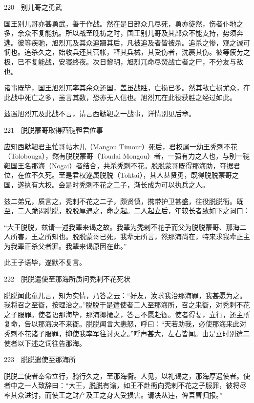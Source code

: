 \documentclass[12pt,UTF8]{ctexbook}
\begin{document}
220　别儿哥之勇武

国王别儿哥亦甚勇武，善于作战。然在是日部众几尽死，勇亦徒然，伤者仆地之多，余众不复能抗。所以战至晚祷之时，国王别儿哥及其部众不能支持，势须奔逃。彼等疾驰，旭烈兀及其众追蹑其后，凡被追及者皆被杀。追杀之惨，观之诚可悯也。追杀久之，始收兵还其营帐，释其兵械，其受伤者，洗裹其伤。彼等疲劳之极，已不复能战，安寝终夜。次日黎明，旭烈兀命尽焚战亡者之尸，不分友与敌也。

诸事既毕，国王旭烈兀率其余众还国，盖虽战胜，亡损已多。然其敌亡损尤众，在此战中死亡之多，虽言其数，恐亦无人信也。旭烈兀在此役获胜之经过如此。

兹置旭烈兀及此战不言，请言西鞑靼之一战事，详情别见后章。





221　脱脱蒙哥取得西鞑靼君位事

应知西鞑靼君主忙哥帖木儿（Mangou Timour）死后，君权属一幼王秃剌不花（Tolobouga），然有脱脱蒙哥（Toudai Mongou）者，一强有力之人也，与别一鞑靼国王名那海（Nogai）者结合，共杀秃剌不花。脱脱蒙哥既得那海助，夺据君位，在位不久死。至是君权遂属脱脱（Toktai），其人甚贤勇，既得脱脱蒙哥之国，遂执有大权。会是时秃剌不花之二子，渐长成为可以执兵之人。

兹二弟兄，质言之，秃剌不花之二子，颇贤慎，携带护卫甚盛，往役脱脱衙。既至，二人跪谒脱脱，脱脱厚遇之，命之起。二人起立后，年较长者致如下之词曰：

“大王脱脱，兹请一述我辈来谒之故。我辈为秃剌不花子而父为脱脱蒙哥、那海二人所害，王之所知也。脱脱蒙哥已死，我辈无所言，然那海尚在，特来求我辈正主为我辈正杀父者罪。我辈来谒原因在此。”

此王子语毕，遂默不复言。





222　脱脱遣使至那海所质问秃剌不花死状

脱脱闻此童儿言，知为实情，乃答之云：“好友，汝求我治那海罪，我甚愿为之。我将召之至衙，按理治之。”脱脱于是遣使者二人至那海所，召之来衙，对秃剌不花之子服罪。使者语那海毕，那海揶揄之，答言不愿赴衙。使者得复，立行，还主所复命，告以那海决不来衙。脱脱闻言大恚怒，呼曰：“天若助我，必使那海来此对秃剌不花诸子服罪，抑使我率军往讨灭之。”呼声甚大，左右皆闻。由是立时别遣二使者以下述之词往告那海。





223　脱脱遣使至那海所

脱脱二使者奉命立行，骑行久之，至那海衙。人见，以礼谒之，那海厚遇使者。使者中之一人致辞曰：“大王，脱脱有谕，如王不赴衙向秃剌不花之子服罪，彼将尽率其众进讨，而使王之财产及王之身大受损害。请决从违，俾吾曹归报。”
\end{document}
